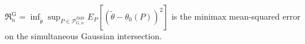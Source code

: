 \(\mathfrak R_{n}^{\mathrm G}=\inf_{\widetilde\theta}\sup_{P\in\mathcal P_{\mathrm G,n}^{\mathrm{JMS}}}E_P[(\widetilde\theta-\theta_0(P))^2]\) is the minimax mean-squared error on the simultaneous Gaussian intersection.